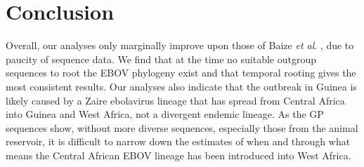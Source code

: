 \documentclass[11pt,oneside,letterpaper]{article}
\begin{document}
\section*{Conclusion}
Overall, our analyses only marginally improve upon those of Baize \textit{et al}. \cite{baize2014}, due to paucity of sequence data. 
We find that at the time no suitable outgroup sequences to root the EBOV phylogeny exist and that temporal rooting gives the most consistent results.
Our analyses also indicate that the outbreak in Guinea is likely caused by a Zaire ebolavirus lineage that has spread from Central Africa into Guinea and West Africa, not a divergent endemic lineage.
As the GP sequences show, without more diverse sequences, especially those from the animal reservoir, it is difficult to narrow down the estimates of when and through what means the Central African EBOV lineage has been introduced into West Africa.




\end{document}
